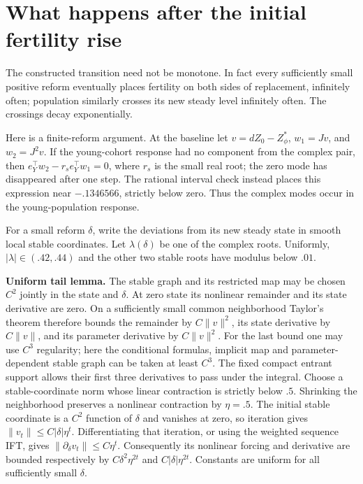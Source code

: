 \documentclass[
  11pt,
]{article}
\begin{document}
\section{What happens after the initial fertility
rise}\label{what-happens-after-the-initial-fertility-rise}

The constructed transition need not be monotone. In fact every
sufficiently small positive reform eventually places fertility on both
sides of replacement, infinitely often; population similarly crosses its
new steady level infinitely often. The crossings decay exponentially.

Here is a finite-reform argument. At the baseline let
\(v=dZ_0-Z_\phi^*\), \(w_1=Jv\), and \(w_2=J^2v\). If the young-cohort
response had no component from the complex pair, then
\(e_Y^\top w_2-r_s e_Y^\top w_1=0\), where \(r_s\) is the small real
root; the zero mode has disappeared after one step. The rational
interval check instead places this expression near \(-.1346566\),
strictly below zero. Thus the complex modes occur in the
young-population response.

For a small reform \(\delta\), write the deviations from its new steady
state in smooth local stable coordinates. Let \(\lambda(\delta)\) be one
of the complex roots. Uniformly, \(|\lambda|\in(.42,.44)\) and the other
two stable roots have modulus below \(.01\).

\textbf{Uniform tail lemma.} The stable graph and its restricted map may
be chosen \(C^2\) jointly in the state and \(\delta\). At zero state its
nonlinear remainder and its state derivative are zero. On a sufficiently
small common neighborhood Taylor's theorem therefore bounds the
remainder by \(C\|v\|^2\), its state derivative by \(C\|v\|\), and its
parameter derivative by \(C\|v\|^2\). For the last bound one may use
\(C^3\) regularity; here the conditional formulas, implicit map and
parameter-dependent stable graph can be taken at least \(C^3\). The
fixed compact entrant support allows their first three derivatives to
pass under the integral. Choose a stable-coordinate norm whose linear
contraction is strictly below \(.5\). Shrinking the neighborhood
preserves a nonlinear contraction by \(\eta=.5\). The initial stable
coordinate is a \(C^2\) function of \(\delta\) and vanishes at zero, so
iteration gives \(\|v_t\|\le C|\delta|\eta^t\). Differentiating that
iteration, or using the weighted sequence IFT, gives
\(\|\partial_\delta v_t\|\le C\eta^t\). Consequently its nonlinear
forcing and derivative are bounded respectively by
\(C\delta^2\eta^{2t}\) and \(C|\delta|\eta^{2t}\). Constants are uniform
for all sufficiently small \(\delta\).
\end{document}
